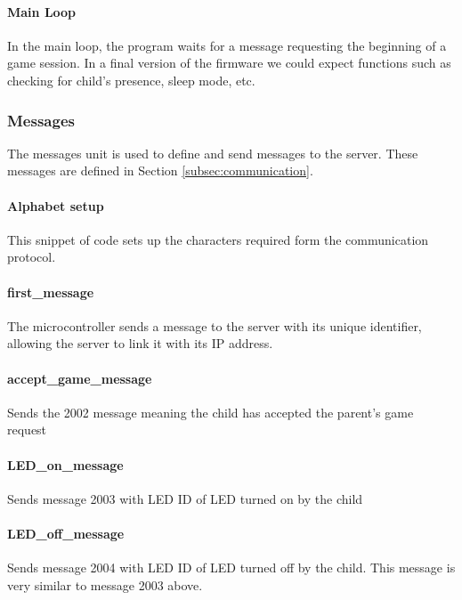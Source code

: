 \paragraph{Main Loop}
In the main loop, the program waits for a message requesting the beginning of a game session. In a final version of the firmware we could expect functions such as checking for child's presence, sleep mode, etc. 



\subsubsection{Messages}
The messages unit is used to define and send messages to the server. These messages are defined in Section \ref{subsec:communication}. 

\paragraph{Alphabet setup} This snippet of code sets up the characters required form the communication protocol. 


\paragraph{first\_message} The microcontroller sends a message to the server with its unique identifier, allowing the server to link it with its IP address.


\paragraph{accept\_game\_message} Sends the 2002 message meaning the child has accepted the parent's game request


\paragraph{LED\_on\_message} Sends message 2003 with LED ID of LED turned on by the child


\paragraph{LED\_off\_message} Sends message 2004 with LED ID of LED turned off by the child. This message is very similar to message 2003 above. 
%

